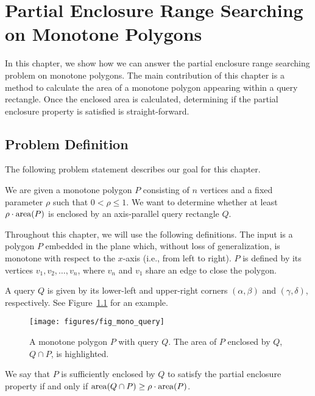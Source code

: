\chapter{Partial Enclosure Range Searching on Monotone Polygons}
\label{:monotonep}


In this chapter, we show how we can answer the partial enclosure range searching problem on monotone polygons. 
The main contribution of this chapter is a method to calculate the area of a monotone polygon appearing within a query rectangle. 
Once the enclosed area is calculated, determining if the partial enclosure property is satisfied is straight-forward.


\section{Problem Definition}
\label{:monotonep:problem-definition}

The following problem statement describes our goal for this chapter.

\begin{problem}
We are given a monotone polygon $P$ consisting of $n$ vertices and a fixed parameter $\rho$ such that $0 < \rho \leq 1$. We want to determine whether at least $\rho \cdot \operatorname{area}\!\left(P\right)$ is enclosed by an axis-parallel query rectangle $Q$.
\end{problem}

Throughout this chapter, we will use the following definitions.
The input is a polygon $P$ embedded in the plane which, without loss of generalization, is monotone with respect to the $x$-axis (i.e., from left to right). 
$P$ is defined by its vertices $v_1, v_2, \ldots, v_n$, where $v_n$ and $v_1$ share an edge to close the polygon.

A query $Q$ is given by its lower-left and upper-right corners $(\alpha, \beta)$ and $(\gamma, \delta)$, respectively. See Figure~\ref{fig:monotonep:query-example} for an example.

\begin{figure}[t]
\begin{center}
  \texttt{[image: figures/fig\_mono\_query]}
  \caption[A monotone polygon $P$ with query $Q$.]{A monotone polygon $P$ with query $Q$. The area of $P$ enclosed by $Q$, $Q \cap P$, is highlighted.}
  \label{fig:monotonep:query-example}
\end{center}
\end{figure}

We say that $P$ is sufficiently enclosed by $Q$ to satisfy the partial enclosure property if and only if $\operatorname{area}\!\left(Q \cap P\right) \geq \rho \cdot \operatorname{area}\!\left(P\right)$.


